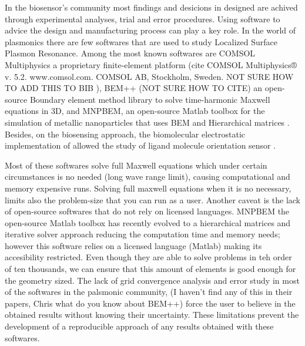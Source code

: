 
In the biosensor's community most findings and desicions in designed are achived 
through experimental analyses, trial and error procedures. Using
software to advice the design and manufacturing process can play a key role. In 
the world of plasmonics there are few softwares that are used to study Localized
Surface Plasmon Resonance. Among the most known softwares are COMSOL Multiphysics
a proprietary finite-element platform ({\color{red}cite COMSOL Multiphysics® v. 5.2. 
www.comsol.com. COMSOL AB, Stockholm, Sweden. NOT SURE HOW TO ADD THIS TO BIB} ), 
BEM++ ({\color{red}NOT SURE HOW TO CITE}) an open-source Boundary element method
library to solve time-harmonic Maxwell equations in 3D, and 
MNPBEM, an open-source Matlab toolbox for the simulation of metallic nanoparticles that
uses BEM and Hierarchical matrices \cite{Hohenester2018}. Besides, on the 
biosensing approach, the biomolecular electrostatic implementation of 
\pygbe \cite{CooperETal2016} allowed the study of ligand molecule orientation 
sensor \cite{CooperClementiBarba2015}.




Most of these softwares solve full Maxwell equations which under certain
circumstances is no needed (long wave range limit), causing computational and 
memory expensive runs. Solving full maxwell equations when it is no necessary, 
limits also the problem-size that you can run as a user. Another caveat is the
 lack of open-source softwares that do not rely on licensed
languages. MNPBEM the open-source Matlab toolbox has recently evolved to a hierarchical
matrices and iterative solver approach reducing the computation time and memory
needs; however this software relies on a licensed language (Matlab) making its
accesibility restricted. Even though they are able to solve problems in teh order
of ten thousands, we can ensure that this amount of elements is good enough for 
the geometry sized. The lack of grid convergence analysis and error study in most of the 
softwares in the palsmonic community,
{\color{red}(I haven't find any of this in their papers, Chris what do you know about BEM++)}
force the user to believe in the obtained results without knowing their uncertainty. These
limitations prevent the development of a reproducible approach of any results obtained
with these softwares. 





